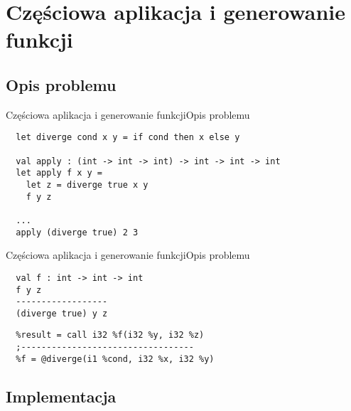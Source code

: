 \documentclass{beamer}
\begin{document}
\section{Częściowa aplikacja i generowanie funkcji}

\subsection{Opis problemu}

\begin{frame}[fragile]{Częściowa aplikacja i generowanie funkcji}{Opis problemu}
\begin{center}
\begin{minipage}{1.0\textwidth}
\begin{verbatim}    
  let diverge cond x y = if cond then x else y

  val apply : (int -> int -> int) -> int -> int -> int
  let apply f x y = 
    let z = diverge true x y
    f y z

  ...
  apply (diverge true) 2 3 
\end{verbatim}
\end{minipage}
\end{center}
\end{frame}

\begin{frame}[fragile]{Częściowa aplikacja i generowanie funkcji}{Opis problemu}
\begin{center}
\begin{minipage}{1.0\textwidth}
\begin{verbatim}    
  val f : int -> int -> int
  f y z
  ------------------
  (diverge true) y z
\end{verbatim}
\begin{verbatim}    
  %result = call i32 %f(i32 %y, i32 %z)
  ;----------------------------------
  %f = @diverge(i1 %cond, i32 %x, i32 %y)
\end{verbatim}
\end{minipage}
\end{center}
\end{frame}

\subsection{Implementacja}
\end{document}
